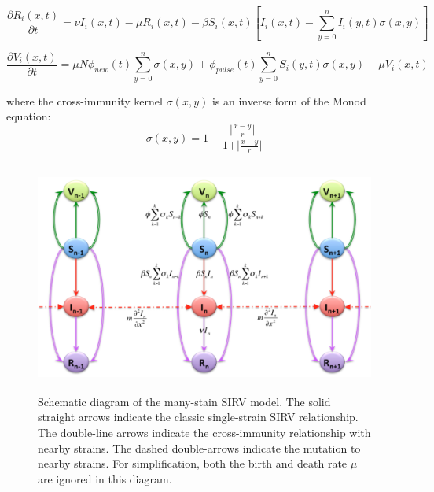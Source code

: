 \documentclass[preprint,12pt]{elsarticle}
\begin{document}
\begin{equation}
  \label{eq:R}
  \frac{\partial R_i(x,t)}{\partial t} = \nu I_i(x,t) - \mu R_i(x,t) - \beta S_i(x,t) [I_i(x,t) - \sum_{y=0}^{n} I_i(y,t)\sigma(x,y)]
\end{equation}

\begin{equation}
  \label{eq:V}
  \frac{\partial V_i(x,t)}{\partial t} = \mu N \phi_{new}(t)\sum_{y=0}^{n} \sigma(x,y) + \phi_{pulse}(t)\sum_{y=0}^{n} S_i(y,t)\sigma(x,y) - \mu V_i(x,t)
\end{equation}

where the cross-immunity kernel \(\sigma(x,y)\) is an inverse form of the Monod equation:
\begin{equation}
  \label{eq:Immunity}
  \sigma(x,y) = 1 - \frac{\vert {\frac{x -y}{r}} \vert}{1 + \vert {\frac{x -y}{r}} \vert}
\end{equation}

\begin{figure}
  \centering
  \includegraphics[width=6in,height=3in]{figures/Diagram}
  \caption{Schematic diagram of the many-stain SIRV model.
  The solid straight arrows indicate the classic single-strain SIRV relationship.
  The double-line arrows indicate the cross-immunity relationship with nearby strains.
  The dashed double-arrows indicate the mutation to nearby strains. For simplification, both the birth and death rate \(\mu\) are ignored in this diagram.}
\label{fig:Diagram}
\end{figure}
\end{document}

